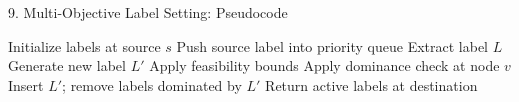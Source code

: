 \documentclass[aspectratio=169]{beamer}
\begin{document}
\begin{frame}[shrink=12]{9. Multi-Objective Label Setting: Pseudocode}
    \scriptsize
    \begin{algorithm}[H]
    \caption{Multi-objective Label Setting}
    \begin{algorithmic}[1]
        \STATE Initialize labels at source \(s\)
        \STATE Push source label into priority queue
            \STATE Extract label \(L\)
                \STATE Generate new label \(L'\)
                \STATE Apply feasibility bounds
                \STATE Apply dominance check at node \(v\)
                    \STATE Insert \(L'\); remove labels dominated by \(L'\)
                \ENDIF
            \ENDFOR
        \ENDWHILE
        \STATE Return active labels at destination
    \end{algorithmic}
    \end{algorithm}
\end{frame}
\end{document}
